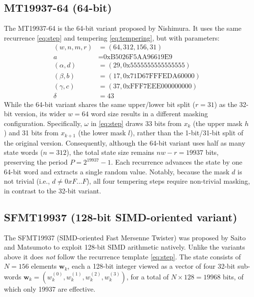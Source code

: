\documentclass[preprint,1p,times]{elsarticle}
\begin{document}
\subsection{MT19937-64 (64-bit)}
\label{sec:mt64}
The MT19937-64 \cite{mt19937_64} is the 64-bit variant proposed by Nishimura. It uses the same recurrence \eqref{eq:step} and tempering \eqref{eq:tempering}, but with parameters:
\begin{equation}
	\label{eq:params64}
	\begin{aligned}
		(w, n, m, r) &= (64, 312, 156, 31)\\
		a &= \text{0xB5026F5AA96619E9}\\
		(\alpha, d) &= (29, \text{0x5555555555555555})\\
		(\beta,  b) &= (17, \text{0x71D67FFFEDA60000})\\
		(\gamma, c) &= (37, \text{0xFFF7EEE000000000})\\
		\delta &= 43
	\end{aligned}
\end{equation}
While the 64-bit variant shares the same upper/lower bit split ($r=31$) as the 32-bit version, its wider $w=64$ word size results in a different masking configuration. Specifically, $\omega$ in \eqref{eq:step} draws 33 bits from $x_k$ (the upper mask $h$) and 31 bits from $x_{k+1}$ (the lower mask $l$), rather than the 1-bit/31-bit split of the original version.
Consequently, although the 64-bit variant uses half as many state words ($n=312$), the total state size remains $nw - r = 19937$ bits, preserving the period $P = 2^{19937}-1$. Each recurrence advances the state by one 64-bit word and extracts a single random value. Notably, because the mask $d$ is not trivial (i.e., $d \neq 0xF\!\dots F$), all four tempering steps require non-trivial masking, in contrast to the 32-bit variant.

\subsection{SFMT19937 (128-bit SIMD-oriented variant)}
\label{sec:sfmt}
The SFMT19937 (SIMD-oriented Fast Mersenne Twister) \cite{sfmt19937} was proposed by Saito and Matsumoto to exploit 128-bit SIMD arithmetic natively. Unlike the variants above it does \emph{not} follow the recurrence template \eqref{eq:step}. The state consists of $N=156$ elements $\mathbf{w}_k$, each a 128-bit integer viewed as a vector of four 32-bit sub-words $\mathbf{w}_k = (w_k^{(0)}, w_k^{(1)}, w_k^{(2)}, w_k^{(3)})$, for a total of $N \times 128 = 19968$ bits, of which only 19937 are effective.
\end{document}

